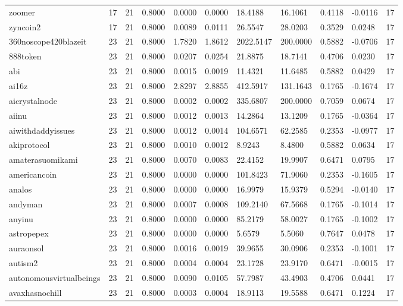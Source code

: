 \begin{table}[htbp]
\begin{tabular}{lllllllllll}
zoomer & 17 & 21 & 0.8000 & 0.0000 & 0.0000 & 18.4188 & 16.1061 & 0.4118 & -0.0116 & 17 \\
zyncoin2 & 17 & 21 & 0.8000 & 0.0089 & 0.0111 & 26.5547 & 28.0203 & 0.3529 & 0.0248 & 17 \\
360noscope420blazeit & 23 & 21 & 0.8000 & 1.7820 & 1.8612 & 2022.5147 & 200.0000 & 0.5882 & -0.0706 & 17 \\
888token & 23 & 21 & 0.8000 & 0.0207 & 0.0254 & 21.8875 & 18.7141 & 0.4706 & 0.0230 & 17 \\
abi & 23 & 21 & 0.8000 & 0.0015 & 0.0019 & 11.4321 & 11.6485 & 0.5882 & 0.0429 & 17 \\
ai16z & 23 & 21 & 0.8000 & 2.8297 & 2.8855 & 412.5917 & 131.1643 & 0.1765 & -0.1674 & 17 \\
aicrystalnode & 23 & 21 & 0.8000 & 0.0002 & 0.0002 & 335.6807 & 200.0000 & 0.7059 & 0.0674 & 17 \\
aiinu & 23 & 21 & 0.8000 & 0.0012 & 0.0013 & 14.2864 & 13.1209 & 0.1765 & -0.0364 & 17 \\
aiwithdaddyissues & 23 & 21 & 0.8000 & 0.0012 & 0.0014 & 104.6571 & 62.2585 & 0.2353 & -0.0977 & 17 \\
akiprotocol & 23 & 21 & 0.8000 & 0.0010 & 0.0012 & 8.9243 & 8.4800 & 0.5882 & 0.0634 & 17 \\
amaterasuomikami & 23 & 21 & 0.8000 & 0.0070 & 0.0083 & 22.4152 & 19.9907 & 0.6471 & 0.0795 & 17 \\
americancoin & 23 & 21 & 0.8000 & 0.0000 & 0.0000 & 101.8423 & 71.9060 & 0.2353 & -0.1605 & 17 \\
analos & 23 & 21 & 0.8000 & 0.0000 & 0.0000 & 16.9979 & 15.9379 & 0.5294 & -0.0140 & 17 \\
andyman & 23 & 21 & 0.8000 & 0.0007 & 0.0008 & 109.2140 & 67.5668 & 0.1765 & -0.1014 & 17 \\
anyinu & 23 & 21 & 0.8000 & 0.0000 & 0.0000 & 85.2179 & 58.0027 & 0.1765 & -0.1002 & 17 \\
astropepex & 23 & 21 & 0.8000 & 0.0000 & 0.0000 & 5.6579 & 5.5060 & 0.7647 & 0.0478 & 17 \\
auraonsol & 23 & 21 & 0.8000 & 0.0016 & 0.0019 & 39.9655 & 30.0906 & 0.2353 & -0.1001 & 17 \\
autism2 & 23 & 21 & 0.8000 & 0.0004 & 0.0004 & 23.1728 & 23.9170 & 0.6471 & -0.0015 & 17 \\
autonomousvirtualbeings & 23 & 21 & 0.8000 & 0.0090 & 0.0105 & 57.7987 & 43.4903 & 0.4706 & 0.0441 & 17 \\
avaxhasnochill & 23 & 21 & 0.8000 & 0.0003 & 0.0004 & 18.9113 & 19.5588 & 0.6471 & 0.1224 & 17 \\

\end{tabular}
\end{table}
